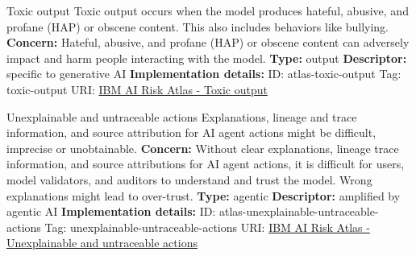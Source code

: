 \begin{definitionbox}{Toxic output}
Toxic output occurs when the model produces hateful, abusive, and profane (HAP) or obscene content. This also includes behaviors like bullying.\newline\newline
\textbf{Concern: }Hateful, abusive, and profane (HAP) or obscene content can adversely impact and harm people interacting with the model.\newline\newline
\textbf{Type: }output\newline
\textbf{Descriptor: }specific to generative AI \newline\newline
\textbf{Implementation details: } \newline
ID: atlas-toxic-output \newline
Tag: toxic-output \newline
URI:  \href{https://www.ibm.com/docs/en/watsonx/saas?topic=SSYOK8/wsj/ai-risk-atlas/toxic-output.html}{IBM AI Risk Atlas - Toxic output}\newline
\end{definitionbox}
\begin{definitionbox}{Unexplainable and untraceable actions}
Explanations, lineage and trace information, and source attribution for AI agent actions might be difficult, imprecise or unobtainable. \newline\newline
\textbf{Concern: }Without clear explanations, lineage trace information, and source attributions for AI agent actions, it is difficult for users, model validators, and auditors to understand and trust the model. Wrong explanations might lead to over-trust.\newline\newline
\textbf{Type: }agentic\newline
\textbf{Descriptor: }amplified by agentic AI \newline\newline
\textbf{Implementation details: } \newline
ID: atlas-unexplainable-untraceable-actions \newline
Tag: unexplainable-untraceable-actions \newline
URI:  \href{https://www.ibm.com/docs/en/watsonx/saas?topic=SSYOK8/wsj/ai-risk-atlas/unexplainable-untraceable-actions.html}{IBM AI Risk Atlas - Unexplainable and untraceable actions}\newline
\end{definitionbox}

